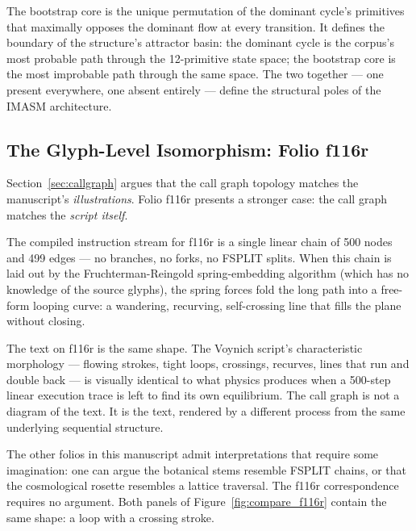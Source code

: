 \documentclass[12pt,a4paper]{article}
\begin{document}
The bootstrap core is the unique permutation of the dominant cycle's primitives that maximally opposes the dominant flow at every transition. It defines the boundary of the structure's attractor basin: the dominant cycle is the corpus's most probable path through the 12-primitive state space; the bootstrap core is the most improbable path through the same space. The two together --- one present everywhere, one absent entirely --- define the structural poles of the IMASM architecture.

\subsection{The Glyph-Level Isomorphism: Folio f116r}

Section~\ref{sec:callgraph} argues that the call graph topology matches the manuscript's \emph{illustrations}. Folio f116r presents a stronger case: the call graph matches the \emph{script itself}.

The compiled instruction stream for f116r is a single linear chain of 500 nodes and 499 edges --- no branches, no forks, no FSPLIT splits. When this chain is laid out by the Fruchterman-Reingold spring-embedding algorithm (which has no knowledge of the source glyphs), the spring forces fold the long path into a free-form looping curve: a wandering, recurving, self-crossing line that fills the plane without closing.

The text on f116r is the same shape. The Voynich script's characteristic morphology --- flowing strokes, tight loops, crossings, recurves, lines that run and double back --- is visually identical to what physics produces when a 500-step linear execution trace is left to find its own equilibrium. The call graph is not a diagram of the text. It is the text, rendered by a different process from the same underlying sequential structure.

The other folios in this manuscript admit interpretations that require some imagination: one can argue the botanical stems resemble FSPLIT chains, or that the cosmological rosette resembles a lattice traversal. The f116r correspondence requires no argument. Both panels of Figure~\ref{fig:compare_f116r} contain the same shape: a loop with a crossing stroke.
\end{document}
